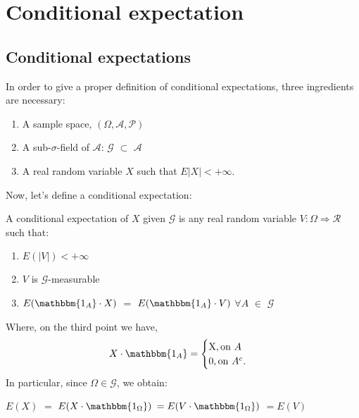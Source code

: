 \chapter{Conditional expectation}
\vspace*{0.5cm}
\setcounter{page}{1}

\section{Conditional expectations}

In order to give a proper definition of conditional expectations, three ingredients are necessary:
\begin{enumerate}
    \item A sample space, $(\Omega, \mathcal{A}, \mathcal{P})$
    \item A sub-$\sigma$-field of $\mathcal{A}$: $\mathcal{G}$ $\subset$ $\mathcal{A}$ 
    \item A real random variable $X$ such that $E|X|< +\infty$.
\end{enumerate}
Now, let's define a conditional expectation:
\begin{definition}
    A conditional expectation of $X$ given $\mathcal{G}$ is any real random variable $V: \Omega \Rightarrow \mathcal{R}$ such that:
    \begin{enumerate}
        \item $E(|V|) < +\infty$
        \item $V$ is $\mathcal{G}$-measurable
        \item $E(\mathbbm{1_A} \cdot X)$ $=$ $E(\mathbbm{1_A} \cdot V)$ $\forall A$ $\in$ $\mathcal{G}$  
    \end{enumerate}
\end{definition}
Where, on the third point we have,
\begin{equation}
        X \cdot \mathbbm{1_A} =\begin{cases}
         $X$, \text{on $A$}\\
         $0$, \text{on $A^c$.}
\end{cases}
\end{equation}
In particular, since $\Omega \in \mathcal{G}$, we obtain:\\
\begin{center}
    $E(X)$ $=$ $E(X \cdot \mathbbm{1_\Omega})$ $= E(V \cdot \mathbbm{1_\Omega})$ $= E(V)$ %
\end{center}


